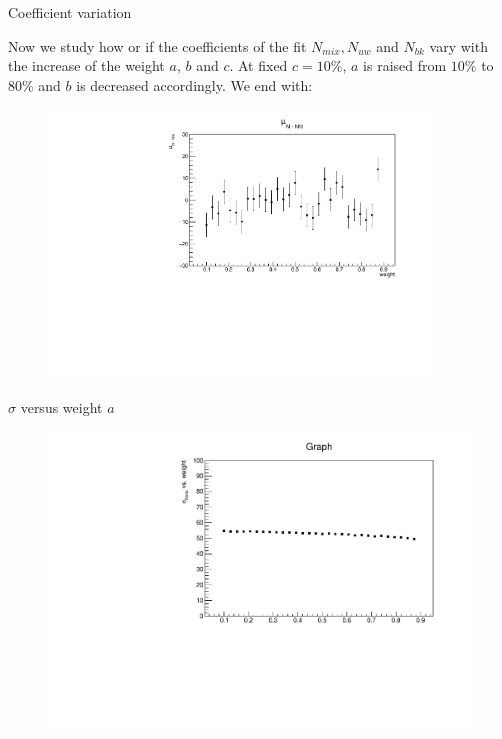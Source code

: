 \documentclass[9pt]{beamer}
\begin{document}
\begin{frame}{Coefficient variation}

Now we study how or if the coefficients of the fit $N_{mix}, N_{uw}$ and $N_{bk}$ vary with the increase of the weight $a$, $b$ and $c$. 
At fixed $c = 10\%$, $a$ is raised from $10\%$ to $80\%$ and $b$ is decreased accordingly. We end with:
\begin{figure}
\includegraphics[width = 0.9\textwidth]{N1000/Nmix_weight.pdf}
\end{figure}

\end{frame}

\begin{frame}{$\sigma$ versus weight $a$}
\begin{figure}
\includegraphics[width = \textwidth]{N1000/sigma_weight.pdf}
\end{figure}
\end{frame}
\end{document}
